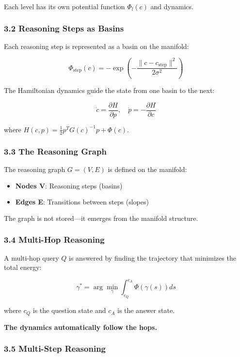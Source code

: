 \documentclass[
  11pt,
  a4paper,
]{article}
\providecommand{\tightlist}{%
  \setlength{\itemsep}{0pt}\setlength{\parskip}{0pt}}
\begin{document}
Each level has its own potential function \(\Phi_l(c)\) and dynamics.

\subsubsection{3.2 Reasoning Steps as
Basins}\label{reasoning-steps-as-basins}

Each reasoning step is represented as a basin on the manifold:

\[
\Phi_{\text{step}}(c) = -\exp\left(-\frac{\|c - c_{\text{step}}\|^2}{2\sigma^2}\right)
\]

The Hamiltonian dynamics guide the state from one basin to the next:

\[
\dot{c} = \frac{\partial H}{\partial p}, \quad \dot{p} = -\frac{\partial H}{\partial c}
\]

where \(H(c, p) = \frac{1}{2} p^T G(c)^{-1} p + \Phi(c)\).

\subsubsection{3.3 The Reasoning Graph}\label{the-reasoning-graph}

The reasoning graph \(G = (V, E)\) is defined on the manifold:

\begin{itemize}
\tightlist
\item
  \textbf{Nodes V}: Reasoning steps (basins)
\item
  \textbf{Edges E}: Transitions between steps (slopes)
\end{itemize}

The graph is not stored---it emerges from the manifold structure.

\subsubsection{3.4 Multi-Hop Reasoning}\label{multi-hop-reasoning-1}

A multi-hop query \(Q\) is answered by finding the trajectory that
minimizes the total energy:

\[
\gamma^* = \arg\min_{\gamma} \int_{c_Q}^{c_A} \Phi(\gamma(s)) ds
\]

where \(c_Q\) is the question state and \(c_A\) is the answer state.

\textbf{The dynamics automatically follow the hops.}

\subsubsection{3.5 Multi-Step Reasoning}\label{multi-step-reasoning}
\end{document}
